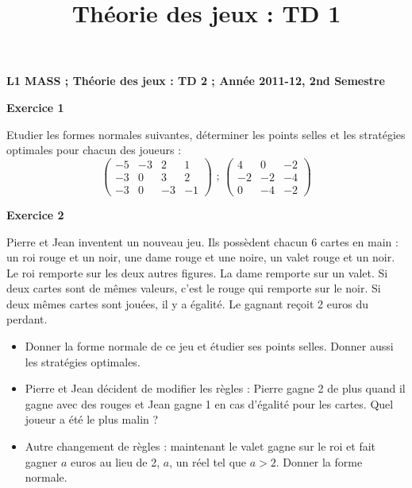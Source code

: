 \documentclass[12pt]{article}
\title{Th\'eorie des jeux : TD 1}
\date{}
\begin{document}
\pagestyle{empty}

\textbf{L1 MASS ;   Th\'eorie des jeux : TD 2    ;      Ann\'ee 2011-12, 2nd Semestre}
\medskip
\medskip
\medskip

\begin{center}
\textbf{Exercice 1}
\end{center}


Etudier les formes normales suivantes, d\'eterminer les points selles et les strat\'egies optimales pour chacun des joueurs :
\begin{equation*}
\begin{pmatrix}
-5&-3&2&1\\
-3&0&3&2\\
-3&0&-3&-1
\end{pmatrix} \text{ ; }
\begin{pmatrix}
4&0&-2\\
-2&-2&-4\\
0&-4&-2
\end{pmatrix}
\end{equation*}

\medskip
\medskip
\begin{center}
\textbf{Exercice 2}
\end{center}
Pierre et Jean inventent un nouveau jeu. Ils poss\`edent chacun 6 cartes en main : un roi rouge et un noir,
une dame rouge et une noire, un valet rouge et un noir. Le roi remporte sur les deux autres figures. La dame remporte sur un valet. 
Si deux cartes sont de m\^emes valeurs, c'est le rouge qui remporte sur le noir. Si deux m\^emes cartes sont jou\'ees, il y a \'egalit\'e. Le gagnant re\c coit 2 euros du perdant.

\begin{itemize}
\item Donner la forme normale de ce jeu et \'etudier ses points selles. Donner aussi les strat\'egies optimales.
\item Pierre et Jean d\'ecident de modifier les r\`egles : Pierre gagne 2 de plus quand il gagne avec des rouges et Jean gagne 1 en cas d'\'egalit\'e pour les cartes. 
Quel joueur a \'et\'e le plus malin ? 
\item Autre changement de r\`egles : maintenant le valet gagne sur le roi et fait gagner $a$ euros au lieu de 2, $a$, un r\'eel tel que $a>2$. Donner la forme normale. 
\end{itemize}
\medskip
\medskip
\end{document}
